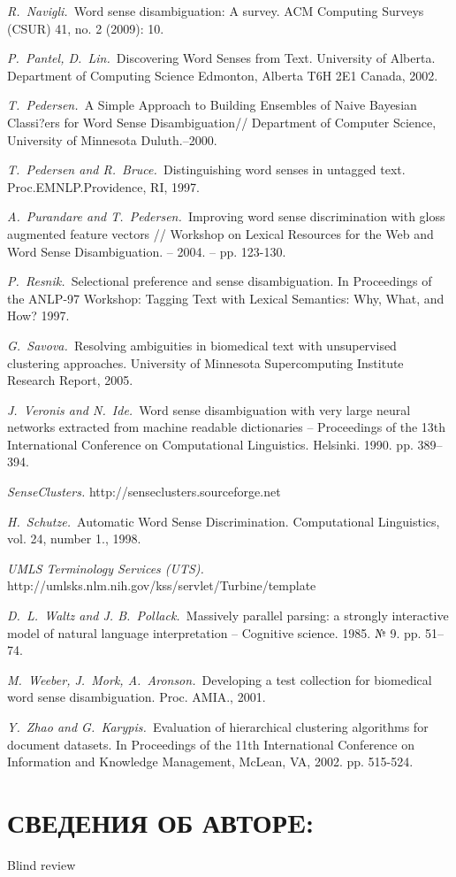 \documentclass{article}
\begin{document}
\begin{articletext}
\begin{thebibliography}{9}
\textit{R.~Navigli.~}Word sense disambiguation: A survey. ACM Computing Surveys (CSUR) 41, no. 2 (2009): 10.

\textit{P.~Pantel, D.~Lin.~}Discovering Word Senses from Text. University of Alberta. Department of Computing Science Edmonton, Alberta T6H 2E1 Canada, 2002.

\textit{T.~Pedersen.~}A Simple Approach to Building Ensembles of Naive Bayesian Classi?ers for Word Sense Disambiguation// Department of Computer Science, University of Minnesota Duluth.–2000.

\textit{T.~Pedersen and R.~Bruce.~}Distinguishing word senses in untagged text. Proc.EMNLP.Providence, RI, 1997.

\textit{A.~Purandare and T.~Pedersen.~}Improving word sense discrimination with gloss augmented feature vectors // Workshop on Lexical Resources for the Web and Word Sense Disambiguation. – 2004. – pp. 123-130. 

\textit{P.~Resnik.~}Selectional preference and sense disambiguation. In Proceedings of the ANLP-97 Workshop: Tagging Text with Lexical Semantics: Why, What, and How? 1997.

\textit{G.~Savova.~}Resolving ambiguities in biomedical text with unsupervised clustering approaches. University of Minnesota Supercomputing Institute Research Report, 2005.

\textit{J.~Veronis and N.~Ide.~}Word  sense  disambiguation  with  very  large neural  networks  extracted  from machine readable dictionaries – Proceedings of the 13th International Conference on Computational Linguistics. Helsinki. 1990. pp. 389–394.

\textit{SenseClusters. } http://senseclusters.sourceforge.net

\textit{H.~Schutze.~}Automatic Word Sense Discrimination. Computational Linguistics, vol. 24, number 1., 1998.

\textit{UMLS Terminology Services (UTS).} http://umlsks.nlm.nih.gov/kss/servlet/Turbine/template

\textit{D.~L.~Waltz and J. B.~Pollack.~}Massively parallel parsing: a strongly interactive  model  of  natural  language interpretation – Cognitive science. 1985. № 9. pp. 51–74.

\textit{M.~Weeber, J.~Mork, A.~Aronson.~}Developing a test collection for biomedical word sense disambiguation. Proc. AMIA., 2001.

\textit{Y.~Zhao and G.~Karypis.~}Evaluation of hierarchical clustering algorithms for document datasets. In Proceedings of the 11th International Conference on Information and Knowledge Management, McLean, VA, 2002. pp. 515-524.



\end{thebibliography}
\end{articletext}


\section{СВЕДЕНИЯ ОБ АВТОРE:}

Blind review
\end{document}
